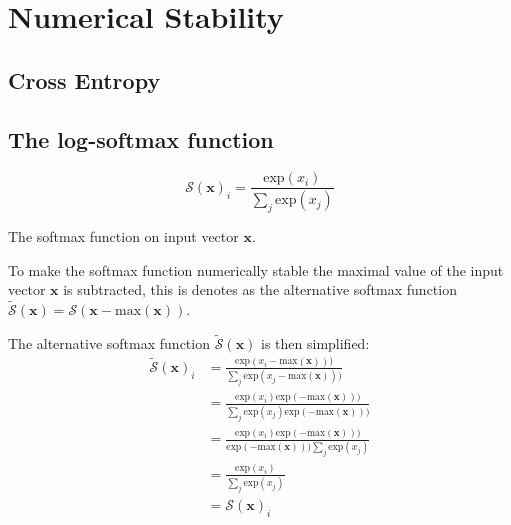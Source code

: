 \chapter{Numerical Stability}

\section{Cross Entropy}
\label{appendix:numerical-stability:cross-entropy}


\section{The log-softmax function}
\label{appendix:numerical-stability:log-softmax}

\begin{equationbox}[H]
\begin{equation*}
\mathcal{S}(\mathbf{x})_i = \frac{\mathrm{exp}(x_i)}{\sum_j \mathrm{exp}(x_j)}
\end{equation*}
\caption{The softmax function on input vector $\mathbf{x}$.}
\end{equationbox}

To make the softmax function numerically stable the maximal value of the input vector $\mathbf{x}$ is subtracted, this is denotes as the alternative softmax function $\tilde{\mathcal{S}}(\mathbf{x}) = \mathcal{S}(\mathbf{x} - \mathrm{max}(\mathbf{x}))$.

The alternative softmax function $\tilde{\mathcal{S}}(\mathbf{x})$ is then simplified:
\begin{equation}
\begin{aligned}
\tilde{\mathcal{S}}(\mathbf{x})_i
&= \frac{\mathrm{exp}(x_i - \mathrm{max}(\mathbf{x})))}{\sum_j \mathrm{exp}(x_j - \mathrm{max}(\mathbf{x})))} \\
&= \frac{\mathrm{exp}(x_i)\mathrm{exp}(- \mathrm{max}(\mathbf{x})))}{\sum_j \mathrm{exp}(x_j)\mathrm{exp}(- \mathrm{max}(\mathbf{x})))} \\
&= \frac{\mathrm{exp}(x_i)\mathrm{exp}(- \mathrm{max}(\mathbf{x})))}{\mathrm{exp}(- \mathrm{max}(\mathbf{x}))) \sum_j \mathrm{exp}(x_j)} \\
&= \frac{\mathrm{exp}(x_i)}{\sum_j \mathrm{exp}(x_j)} \\
&= \mathcal{S}(\mathbf{x})_i
\end{aligned}
\label{eq:appendix:numerical:log-softmax:softmax-mmax}
\end{equation}


